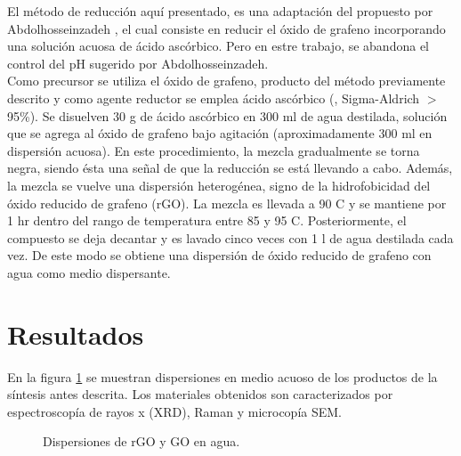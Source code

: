 El método de reducción aquí presentado, es una adaptación del propuesto por Abdolhosseinzadeh \citep{Abdolhosseinzadeh2015}, el cual consiste en reducir el óxido de grafeno incorporando una solución acuosa de ácido ascórbico. Pero en estre trabajo, se abandona el control del pH sugerido por Abdolhosseinzadeh.
\\
Como precursor se utiliza el óxido de grafeno, producto del método previamente descrito y como agente reductor se emplea ácido ascórbico (, Sigma-Aldrich $>$95\%). Se disuelven 30 g de ácido ascórbico en 300 ml de agua destilada, solución que se agrega al óxido de grafeno bajo agitación (aproximadamente 300 ml en dispersión acuosa). En este procedimiento, la mezcla gradualmente se torna negra, siendo ésta una señal de que la reducción se está llevando a cabo. Además, la mezcla se vuelve una dispersión heterogénea, signo de la hidrofobicidad del óxido reducido de grafeno (rGO). La mezcla es llevada a 90 \degree C y se mantiene por 1 hr dentro del rango de temperatura entre 85 y 95 \degree C. Posteriormente, el compuesto se deja decantar y es lavado cinco veces con 1 l de agua destilada cada vez. De este modo se obtiene una dispersión de óxido reducido de grafeno con agua como medio dispersante.

\section{Resultados}
En la figura \ref{fig:RGOyGO} se muestran dispersiones en medio acuoso de los productos de la síntesis antes descrita.
Los materiales obtenidos son caracterizados por espectroscopía de rayos x (XRD), Raman y microcopía SEM.

\begin{figure}[h]
	\centering
	\caption[Dispersiones de rGO y GO en agua]{Dispersiones de rGO y GO en agua.}
	\label{fig:RGOyGO}
\end{figure}

